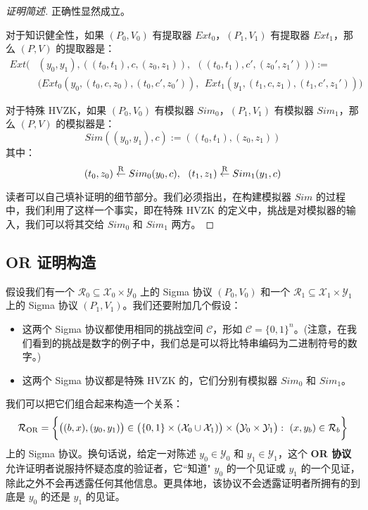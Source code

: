 \begin{proof}[证明简述]
正确性显然成立。

对于知识健全性，如果 $(P_0,V_0)$ 有提取器 $Ext_0$，$(P_1,V_1)$ 有提取器 $Ext_1$，那么 $(P, V)$ 的提取器是：
\begin{equation*}
\begin{aligned}
Ext
\Big( & (y_0,y_1),((t_0,t_1),c,(z_0,z_1)),~~((t_0,t_1),c',(z_0',z_1'))
\Big):=\\
& \Big(Ext_0(y_0,(t_0,c,z_0),(t_0,c',z_0')),~~Ext_1(y_1,(t_1,c,z_1),(t_1,c',z_1'))\Big)
\end{aligned}
\end{equation*}

对于特殊 HVZK，如果 $(P_0,V_0)$ 有模拟器 $Sim_0$，$(P_1,V_1)$ 有模拟器 $Sim_1$，那么 $(P, V)$ 的模拟器是：
$$
Sim((y_0,y_1),c):=((t_0,t_1),(z_0,z_1))
$$
其中：
$$
(t_0,z_0)\overset{\rm R}\leftarrow Sim_0(y_0,c),~~
(t_1,z_1)\overset{\rm R}\leftarrow Sim_1(y_1,c)
$$

读者可以自己填补证明的细节部分。我们必须指出，在构建模拟器 $Sim$ 的过程中，我们利用了这样一个事实，即在特殊 HVZK 的定义中，挑战是对模拟器的输入，我们可以将其交给 $Sim_0$ 和 $Sim_1$ 两方。
\end{proof}

\subsection{OR 证明构造}\label{subsec:19-7-2}

假设我们有一个 $\mathcal{R}_0\subseteq\mathcal{X}_0\times\mathcal{Y}_0$ 上的 Sigma 协议 $(P_0,V_0)$ 和一个 $\mathcal{R}_1\subseteq\mathcal{X}_1\times\mathcal{Y}_1$ 上的 Sigma 协议 $(P_1,V_1)$。我们还要附加几个假设：
\begin{itemize}
	\item 这两个 Sigma 协议都使用相同的挑战空间 $\mathcal{C}$，形如 $\mathcal{C}=\{0,1\}^n$。(注意，在我们看到的挑战是数字的例子中，我们总是可以将比特串编码为二进制符号的数字。)
	\item 这两个 Sigma 协议都是特殊 HVZK 的，它们分别有模拟器 $Sim_0$ 和 $Sim_1$。
\end{itemize}
我们可以把它们组合起来构造一个关系：
\begin{equation}\label{eq:19-23}
\mathcal{R}_{\rm OR}=
\bigg\lbrace
\big((b,x), (y_0,y_1)\big)\in\big(\{0,1\}\times(\mathcal{X}_0\cup\mathcal{X}_1)\big)\times\big(\mathcal{Y}_0\times\mathcal{Y}_1\big):~(x,y_b)\in\mathcal{R}_b
\bigg\rbrace
\end{equation}
上的 Sigma 协议。换句话说，给定一对陈述 $y_0\in\mathcal{Y}_0$ 和 $y_1\in\mathcal{Y}_1$，这个 \textbf{OR 协议}允许证明者说服持怀疑态度的验证者，它``知道" $y_0$ 的一个见证或 $y_1$ 的一个见证，除此之外不会再透露任何其他信息。更具体地，该协议不会透露证明者所拥有的到底是 $y_0$ 的还是 $y_1$ 的见证。

